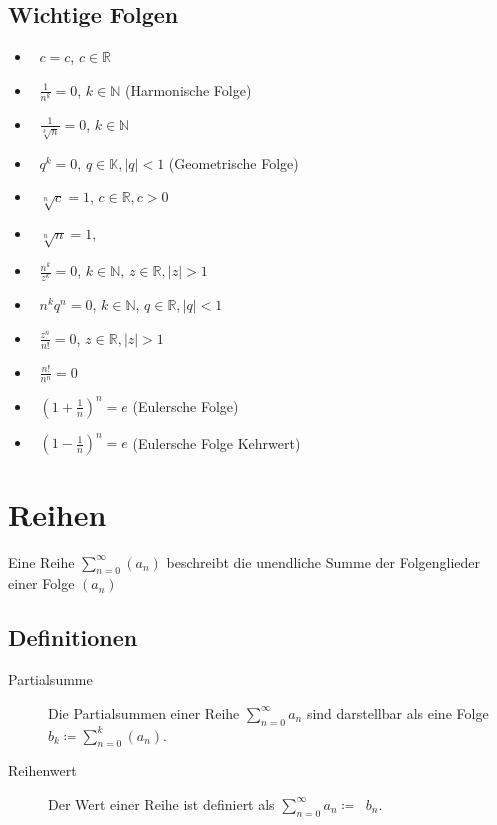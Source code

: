 \documentclass[a4paper, 11pt, accentcolor = tud3b]{tudreport}
\DeclareMathOperator{\liminfty}{\lim _ { n \rightarrow \infty }}
\begin{document}
        \section{Wichtige Folgen}
            \begin{itemize}
                \item $ \liminfty c = c $, $ c \in \mathbb{R} $
                \item $ \liminfty \frac{1}{n ^ k} = 0 $, $ k \in \mathbb{N} $ (Harmonische Folge)
                \item $ \liminfty \frac{1}{\sqrt[k]{n}} = 0 $, $ k \in \mathbb{N} $
                \item $ \liminfty q ^ k = 0 $, $ q \in \mathbb{K}, \lvert q \rvert < 1 $ (Geometrische Folge)
                \item $ \liminfty \sqrt[n]{c} = 1 $, $ c \in \mathbb{R}, c > 0 $
                \item $ \liminfty \sqrt[n]{n} = 1 $,
                \item $ \liminfty \frac{n ^ k}{z ^ k} = 0 $, $ k \in \mathbb{N} $, $ z \in \mathbb{R}, \lvert z \rvert > 1 $
                \item $ \liminfty n ^ k q ^ n = 0 $, $ k \in \mathbb{N} $, $ q \in \mathbb{R}, \lvert q \rvert < 1 $
                \item $ \liminfty \frac{z ^ n}{n!} = 0 $, $ z \in \mathbb{R}, \lvert z \rvert > 1 $
                \item $ \liminfty \frac{n!}{n ^ n} = 0 $
                \item $ \liminfty (1 + \frac{1}{n}) ^ n = e $ (Eulersche Folge)
                \item $ \liminfty (1 - \frac{1}{n}) ^ n = e $ (Eulersche Folge Kehrwert)
            \end{itemize}

    \chapter{Reihen}
        Eine Reihe $ \sum _ { n = 0 } ^ \infty (a _ n) $ beschreibt die unendliche Summe der Folgenglieder einer Folge $ (a _ n) $

        \section{Definitionen}
            \begin{description}
                \item[Partialsumme] Die Partialsummen einer Reihe $ \sum _ { n = 0 } ^ \infty a _ n $ sind darstellbar als eine Folge $ b _ k \coloneqq \sum _ { n = 0 } ^ k (a _ n) $.
                \item[Reihenwert] Der Wert einer Reihe ist definiert als $ \sum _ { n = 0 } ^ \infty a _ n \coloneqq \liminfty b _ n $.
            \end{description}
\end{document}
